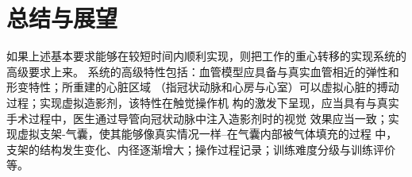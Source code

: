 \chapter{总结与展望}
\label{chap10}

如果上述基本要求能够在较短时间内顺利实现，则把工作的重心转移的实现系统的高级要求上来。
系统的高级特性包括：血管模型应具备与真实血管相近的弹性和形变特性；所重建的心脏区域
（指冠状动脉和心房与心室）可以虚拟心脏的搏动过程；实现虚拟造影剂，该特性在触觉操作机
构的激发下呈现，应当具有与真实手术过程中，医生通过导管向冠状动脉中注入造影剂时的视觉
效果应当一致；实现虚拟支架-气囊，使其能够像真实情况一样--在气囊内部被气体填充的过程
中，支架的结构发生变化、内径逐渐增大；操作过程记录；训练难度分级与训练评价等。

